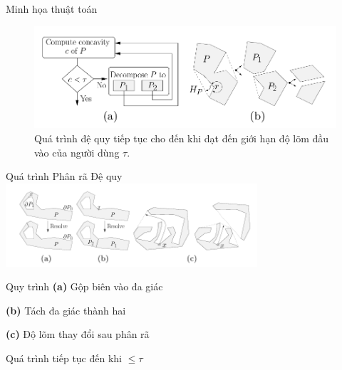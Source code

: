 \documentclass[aspectratio=169]{beamer}
\begin{document}
\begin{frame}{Minh họa thuật toán}
    \begin{figure}
        \centering
        \includegraphics[width=0.8\linewidth]{../imgs/ACD-1.png}
        \caption{Quá trình đệ quy tiếp tục cho đến khi đạt đến giới hạn độ lõm đầu vào của người dùng $\tau$.}
    \end{figure}
\end{frame}

\begin{frame}{Quá trình Phân rã Đệ quy}
    \centering
    \includegraphics[width=0.7\textwidth]{../imgs/ACD-3.png}

    \begin{block}{Quy trình}
        \textbf{(a)} Gộp biên vào đa giác

        \textbf{(b)} Tách đa giác thành hai

        \textbf{(c)} Độ lõm thay đổi sau phân rã

        \vspace{0.2cm}
        Quá trình tiếp tục đến khi $\leq \tau$
    \end{block}
\end{frame}
\end{document}
